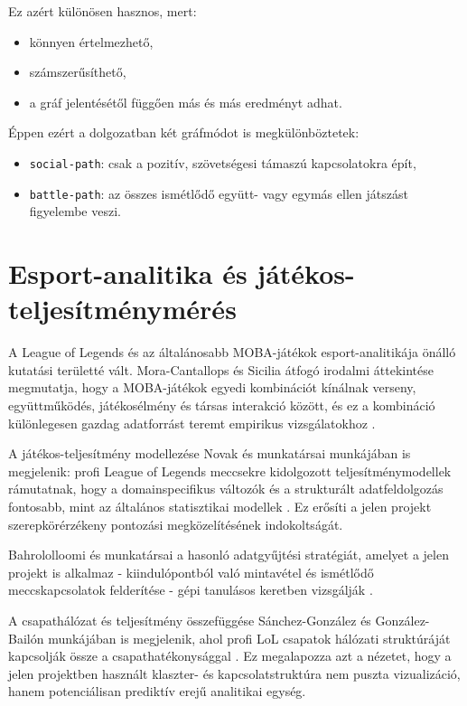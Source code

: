 ﻿\documentclass[a4paper,12pt]{report}
\begin{document}
Ez azért különösen hasznos, mert:

\begin{itemize}
    \item könnyen értelmezhető,
    \item számszerűsíthető,
    \item a gráf jelentésétől függően más és más eredményt adhat.
\end{itemize}

Éppen ezért a dolgozatban két gráfmódot is megkülönböztetek:

\begin{itemize}
    \item \texttt{social-path}: csak a pozitív, szövetségesi támaszú kapcsolatokra épít,
    \item \texttt{battle-path}: az összes ismétlődő együtt- vagy egymás ellen játszást figyelembe veszi.
\end{itemize}

\section{Esport-analitika és játékos-teljesítménymérés}

A League of Legends és az általánosabb MOBA-játékok esport-analitikája önálló kutatási területté vált. Mora-Cantallops és Sicilia átfogó irodalmi áttekintése megmutatja, hogy a MOBA-játékok egyedi kombinációt kínálnak verseny, együttműködés, játékosélmény és társas interakció között, és ez a kombináció különlegesen gazdag adatforrást teremt empirikus vizsgálatokhoz \cite{moracantallops2019}.

A játékos-teljesítmény modellezése Novak és munkatársai munkájában is megjelenik: profi League of Legends meccsekre kidolgozott teljesítménymodellek rámutatnak, hogy a domainspecifikus változók és a strukturált adatfeldolgozás fontosabb, mint az általános statisztikai modellek \cite{novak2022}. Ez erősíti a jelen projekt szerepkörérzékeny pontozási megközelítésének indokoltságát.

Bahrololloomi és munkatársai a hasonló adatgyűjtési stratégiát, amelyet a jelen projekt is alkalmaz - kiindulópontból való mintavétel és ismétlődő meccskapcsolatok felderítése - gépi tanulásos keretben vizsgálják \cite{bahrololloomi2021}.

A csapathálózat és teljesítmény összefüggése Sánchez-González és González-Bailón munkájában is megjelenik, ahol profi LoL csapatok hálózati struktúráját kapcsolják össze a csapathatékonysággal \cite{sanchezgonzalezBailon2023}. Ez megalapozza azt a nézetet, hogy a jelen projektben használt klaszter- és kapcsolatstruktúra nem puszta vizualizáció, hanem potenciálisan prediktív erejű analitikai egység.
\end{document}

